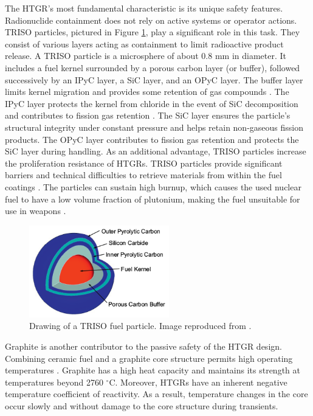 The HTGR's most fundamental characteristic is its unique safety features.
Radionuclide containment does not rely on active systems or operator actions.
\gls{TRISO} particles, pictured in Figure \ref{fig:triso}, play a significant role in this task.
They consist of various layers acting as containment to limit radioactive product release.
A \gls{TRISO} particle is a microsphere of about 0.8 mm in diameter.
It includes a fuel kernel surrounded by a porous carbon layer (or buffer), followed successively by an \gls{IPyC} layer, a \gls{SiC} layer, and an \gls{OPyC} layer.
The buffer layer limits kernel migration and provides some retention of gas compounds \cite{oecd_nea_benchmark_2017}.
The \gls{IPyC} layer protects the kernel from chloride in the event of \gls{SiC} decomposition and contributes to fission gas retention \cite{demkowickz_paul_triso_2019}.
The \gls{SiC} layer ensures the particle's structural integrity under constant pressure and helps retain non-gaseous fission products.
The \gls{OPyC} layer contributes to fission gas retention and protects the \gls{SiC} layer during handling.
As an additional advantage, \gls{TRISO} particles increase the proliferation resistance of \glspl{HTGR}.
TRISO particles provide significant barriers and technical difficulties to retrieve materials from within the fuel coatings \cite{paviet-hartmann_analysis_2011}.
The particles can sustain high burnup, which causes the used nuclear fuel to have a low volume fraction of plutonium, making the fuel unsuitable for use in weapons \cite{paviet-hartmann_analysis_2011}.

\begin{figure}[htbp!]
	\centering
	\includegraphics[height=4.0cm]{figures/triso}
	\caption{Drawing of a TRISO fuel particle. Image reproduced from \cite{hales_multidimensional_2013}.}
	\label{fig:triso}
\end{figure}

Graphite is another contributor to the passive safety of the \gls{HTGR} design.
Combining ceramic fuel and a graphite core structure permits high operating temperatures \cite{ballinger_balance_2004}.
Graphite has a high heat capacity and maintains its strength at temperatures beyond 2760 $^{\circ}$C.
Moreover, HTGRs have an inherent negative temperature coefficient of reactivity.
As a result, temperature changes in the core occur slowly and without damage to the core structure during transients.

